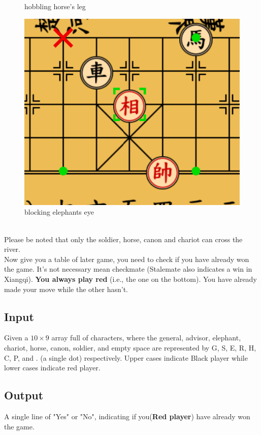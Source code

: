 \documentclass[12pt,a4paper]{article}
\begin{document}
\begin{figure}[htbp]
\begin{minipage}[b]{0.25\textwidth}
        \caption{hobbling horse's leg}
    \end{minipage}
    \begin{minipage}[b]{0.27\textwidth}
        \centering
        \includegraphics[width=\linewidth]{Xiangqi.assets/Elephant_movement.png}
        \caption{blocking elephant\textquotesingle s eye}
    \end{minipage}
\end{figure}
\\
\noindent
Please be noted that only the soldier, horse, canon and chariot can cross the river.
\\
\noindent
Now give you a table of later game, you need to check if you have already won the game. It's not necessary mean checkmate (Stalemate also indicates a win in Xiangqi).
\textbf{You always play red} (i.e., the one on the bottom). You have already made your move while the other hasn't.
\subsection*{\fontsize{16}{12}Input}
Given a $10\times9$ array full of characters, where the general, advisor, elephant, chariot, horse, canon, soldier, and empty space are represented by G, S, E, R, H, C, P, and . (a single dot) respectively. Upper cases indicate Black player while lower cases indicate red player.
\subsection*{\fontsize{16}{12}Output}
A single line of "Yes" or "No", indicating if you(\textbf{Red player}) have already won the game.
\end{document}
